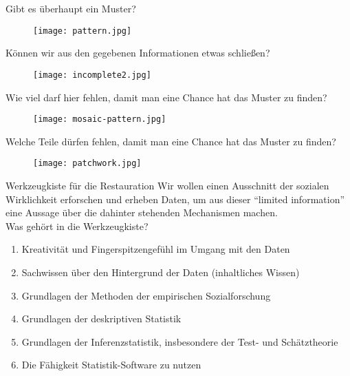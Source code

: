 \documentclass[usenames,dvipsnames,handout]{beamer}
\begin{document}
\begin{frame}{Gibt es überhaupt ein Muster?}
     \begin{figure}[ht]
 	\centering
 	      \texttt{[image: pattern.jpg]}
 	\end{figure}
\end{frame}

\begin{frame}{Können wir aus den gegebenen Informationen etwas schließen?}
     \begin{figure}[ht]
 	\centering
 	      \texttt{[image: incomplete2.jpg]}
 	\end{figure}
\end{frame}

\begin{frame}{Wie viel darf hier fehlen, damit man eine Chance hat das Muster zu finden?}
     \begin{figure}[ht]
 	\centering
 	      \texttt{[image: mosaic-pattern.jpg]}
 	\end{figure}
\end{frame}

\begin{frame}{Welche Teile dürfen fehlen, damit man eine Chance hat das Muster zu finden?}
     \begin{figure}[ht]
 	\centering
 	      \texttt{[image: patchwork.jpg]}
 	\end{figure}
\end{frame}



\begin{frame}{Werkzeugkiste für die Restauration}
Wir wollen einen Ausschnitt der sozialen Wirklichkeit erforschen und erheben Daten,
um aus dieser  ``limited information'' eine Aussage über die dahinter stehenden 
Mechanismen machen.\\
Was gehört in die Werkzeugkiste?\pause
\begin{enumerate}
\item{Kreativität und Fingerspitzengefühl im Umgang mit den Daten}\pause
\item{Sachwissen über den Hintergrund der Daten (inhaltliches Wissen)}\pause
\item{Grundlagen der Methoden der empirischen Sozialforschung}\pause
\item{Grundlagen der deskriptiven Statistik}\pause
\item{Grundlagen der Inferenzstatistik, insbesondere der Test- und Schätztheorie}\pause
\item{Die Fähigkeit Statistik-Software zu nutzen}
\end{enumerate}

\end{frame}
\end{document}
